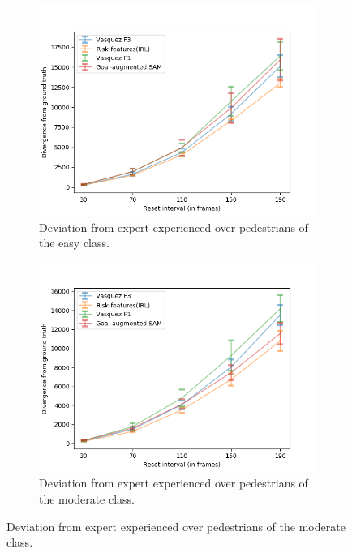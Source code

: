 \begin{figure}[htbp]
	\begin{subfigure}{0.5\textwidth}
		\centering
		\includegraphics[width=\linewidth]{plots/plot_without_outliers/ucy_inter_irl_no_outliers/ucy_irl_easy.png}
		\caption {Deviation from expert experienced over pedestrians of the easy class.}
		\label{fig:inter_IRL-drift_analysis_easy}
	\end{subfigure}
	\begin{subfigure}{0.5\textwidth}
		\centering
		\includegraphics[width=\linewidth]{plots/plot_without_outliers/ucy_inter_irl_no_outliers/ucy_irl_med.png}
		\caption {Deviation from expert experienced over pedestrians of the moderate class.}

\end{subfigure}
\end{figure}
